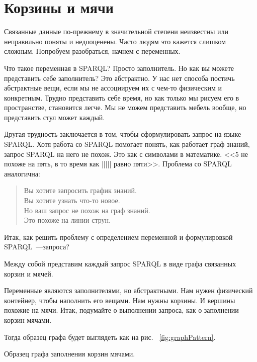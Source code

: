 \chapter{Корзины и мячи}
\label{ch:BucketsAndBalls}

Связанные данные по-прежнему в значительной степени неизвестны или неправильно поняты и недооценены. Часто людям это кажется слишком сложным. 
Попробуем разобраться, начнем с переменных.

Что такое переменная в SPARQL? Просто заполнитель. Но как вы можете представить себе заполнитель? Это абстрактно. У нас нет способа постичь абстрактные вещи, если мы не ассоциируем их с чем-то физическим и конкретным. Трудно представить себе время, но как только мы рисуем его в пространстве, становится легче. Мы не можем представить мебель вообще, но представить стул может каждый.

Другая трудность заключается в том, чтобы сформулировать запрос на языке SPARQL. Хотя работа со SPARQL помогает понять, как работает граф знаний, запрос SPARQL на него не похож. Это как с символами в математике. <<5 не похоже на пять, в то время как ||||| равно пяти>>. Проблема со SPARQL аналогична:

\begin{quote}
Вы хотите запросить график знаний.\\
Вы хотите узнать что-то новое.\\
Но ваш запрос не похож на граф знаний.\\
Это похоже на линии струн.\\
\end{quote}

Итак, как решить проблему с определением переменной и формулировкой SPARQL~---запроса?

Между собой представим каждый запрос SPARQL в виде графа связанных корзин и мячей.

Переменные являются заполнителями, но абстрактными. Нам нужен физический контейнер, чтобы наполнить его вещами. Нам нужны корзины. И вершины похожие на мячи. Итак, подумайте о выполнении запроса, как о заполнении корзин мячами.

Тогда образец графа будет выглядеть как на рис. ~\ref{fig:graphPattern}.

\begin{marginfigure}[-1.5cm]
	{
		\setlength{\fboxsep}{0pt}%
		\setlength{\fboxrule}{1pt}%
	}
    \caption{Образец графа заполнения корзин мячами.}
	\label{fig:graphPattern}
\end{marginfigure}

